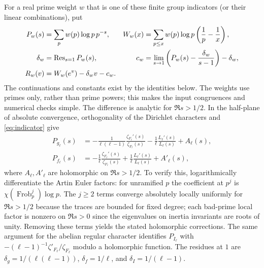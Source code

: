 \documentclass[11pt,letterpaper]{article}
\theoremstyle{definition}\newtheorem{definition}[theorem]{Definition}
\theoremstyle{remark}\newtheorem{remark}[theorem]{Remark}
\begin{document}
For a real prime weight $w$ that is one of these finite group indicators (or their linear combinations), put
\begin{align*}
P_w(s)&=\sum_p w(p)\log p\,p^{-s},& W_w(x)&=\sum_{p\le x}w(p)\log p\left(\frac1p-\frac1x\right),\\
\delta_w&=\operatorname{Res}_{s=1}P_w(s),& c_w&=\lim_{s\to1}\left(P_w(s)-\frac{\delta_w}{s-1}\right)-\delta_w,\\
R_w(v)&=W_w(e^v)-\delta_w v-c_w.&&
\end{align*}
The continuations and constants exist by the identities below. The weights use primes only, rather than prime powers; this makes the input congruences and numerical checks simple. The difference is analytic for $\Re s>1/2$. In the half-plane of absolute convergence, orthogonality of the Dirichlet characters and \eqref{eq:indicator} give
\begin{align}
P_{g_\ell}(s)&=-\frac1{\ell(\ell-1)}\frac{\zeta_{F_\ell}'(s)}{\zeta_{F_\ell}(s)}-\frac1\ell\frac{L_\ell'(s)}{L_\ell(s)}+A_\ell(s),\label{eq:p-g}\\
P_{f_\ell}(s)&=-\frac1\ell\frac{\zeta_{F_\ell}'(s)}{\zeta_{F_\ell}(s)}+\frac1\ell\frac{L_\ell'(s)}{L_\ell(s)}+A'_\ell(s),\label{eq:p-f}
\end{align}
where $A_\ell,A'_\ell$ are holomorphic on $\Re s>1/2$. To verify this, logarithmically differentiate the Artin Euler factors: for unramified $p$ the coefficient at $p^j$ is $\chi(\operatorname{Frob}_p^j)\log p$. The $j\ge2$ terms converge absolutely locally uniformly for $\Re s>1/2$ because the traces are bounded for fixed degree; each bad-prime local factor is nonzero on $\Re s>0$ since the eigenvalues on inertia invariants are roots of unity. Removing these terms yields the stated holomorphic corrections. The same argument for the abelian regular character identifies $P_{I_\ell}$ with $-(\ell-1)^{-1}\zeta'_{F_\ell}/\zeta_{F_\ell}$ modulo a holomorphic function. The residues at $1$ are $\delta_g=1/(\ell(\ell-1))$, $\delta_f=1/\ell$, and $\delta_I=1/(\ell-1)$.
\end{document}
